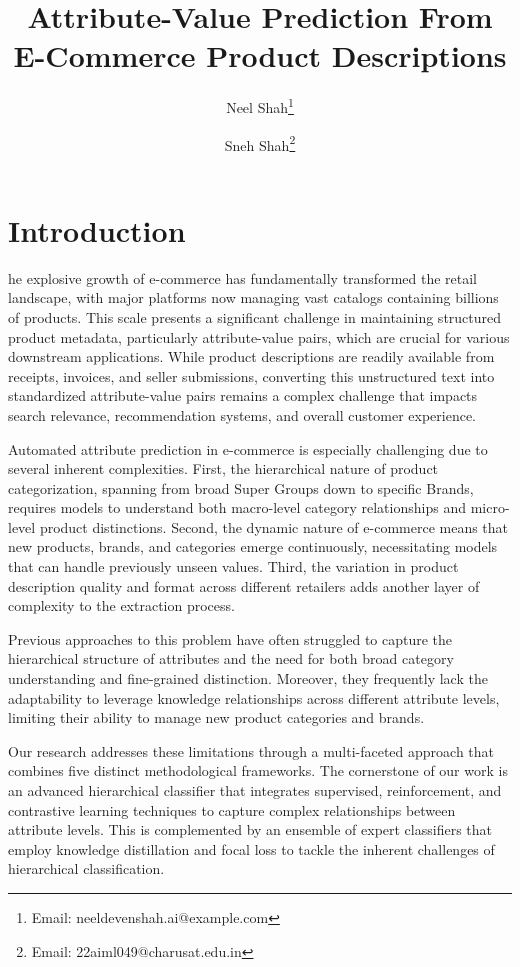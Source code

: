 \documentclass[9pt,a4paper,twoside]{rho-class/rho}
\title{Attribute-Value Prediction From E-Commerce Product Descriptions}
\author[1,$\dagger$]{Neel Shah\thanks{Email: neeldevenshah.ai@example.com}}
\author[1,$\dagger$]{Sneh Shah\thanks{Email: 22aiml049@charusat.edu.in}}
\affil[1]{Charotar University of Science and Technology }
\affil[$\dagger$]{These authors contributed equally to this work}
\begin{document}
	
    \maketitle
    \thispagestyle{firststyle}
    \nolinenumbers


\section{Introduction}

    he explosive growth of e-commerce has fundamentally transformed the retail landscape, with major platforms now managing vast catalogs containing billions of products. This scale presents a significant challenge in maintaining structured product metadata, particularly attribute-value pairs, which are crucial for various downstream applications. While product descriptions are readily available from receipts, invoices, and seller submissions, converting this unstructured text into standardized attribute-value pairs remains a complex challenge that impacts search relevance, recommendation systems, and overall customer experience.

    Automated attribute prediction in e-commerce is especially challenging due to several inherent complexities. First, the hierarchical nature of product categorization, spanning from broad Super Groups down to specific Brands, requires models to understand both macro-level category relationships and micro-level product distinctions. Second, the dynamic nature of e-commerce means that new products, brands, and categories emerge continuously, necessitating models that can handle previously unseen values. Third, the variation in product description quality and format across different retailers adds another layer of complexity to the extraction process.
    
    Previous approaches to this problem have often struggled to capture the hierarchical structure of attributes and the need for both broad category understanding and fine-grained distinction. Moreover, they frequently lack the adaptability to leverage knowledge relationships across different attribute levels, limiting their ability to manage new product categories and brands.
    
    Our research addresses these limitations through a multi-faceted approach that combines five distinct methodological frameworks. The cornerstone of our work is an advanced hierarchical classifier that integrates supervised, reinforcement, and contrastive learning techniques to capture complex relationships between attribute levels. This is complemented by an ensemble of expert classifiers that employ knowledge distillation and focal loss to tackle the inherent challenges of hierarchical classification.
    
\end{document}
